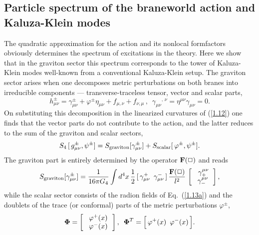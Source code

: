\documentclass[a4paper,preprint,nofootinbib,
                 showpacs,preprintnumbers,amsmath,amssymb]{revtex4}
\begin{document}
 
\subsection{Particle spectrum of the braneworld 
action and Kaluza-Klein modes \label{massless}} 
The quadratic approximation for the action and its nonlocal formfactors 
obviously determines the spectrum of excitations in the theory. Here we 
show that in the graviton sector this spectrum corresponds to the 
tower of Kaluza-Klein modes well-known from a conventional Kaluza-Klein 
setup. The graviton sector arises when one decomposes metric perturbations  
on both branes into irreducible components --- transverse-traceless  
tensor, vector and scalar parts, 
    \begin{equation} 
    h_{\mu\nu}^\pm=\gamma_{\mu\nu}^\pm 
    +\varphi^\pm\eta_{\mu\nu} 
    +f_{\mu,\nu}+f_{\nu,\mu}\,,\,\,\, 
    {\gamma_{\mu\nu}}^{,\,\nu} 
    =\eta^{\mu\nu}\gamma_{\mu\nu}=0.    \label{4.25} 
    \end{equation} 
On substituting this decomposition in the linearized curvatures of  
(\ref{1.12}) one finds that the vector parts do not contribute  
to the action, and the latter reduces to the sum of the graviton and 
scalar sectors, 
    \begin{equation} 
    S_4\,[\,g^\pm_{\mu\nu},\psi^\pm]= 
    S_{\rm graviton}[\gamma^\pm_{\mu\nu}]+ 
    S_{\rm scalar}[\,\varphi^\pm,\psi^\pm]. 
    \end{equation} 
The graviton part is entirely determined by the operator ${\bf 
F}(\Box)$ and reads 
    \begin{equation} 
    S_{\rm graviton}[\gamma^\pm_{\mu\nu}] 
    =\frac1{16\pi G_4}\int 
    d^4x\,\frac12\, 
    [\,\gamma_{\mu\nu}^+\,\,\,\gamma_{\mu\nu}^-\,] 
    \,\frac{\bf F(\Box)}{l^2}\, 
    \left[\begin{array}{c} 
    \,\,\gamma^{\mu\nu}_+ \\ 
    \,\,\gamma^{\mu\nu}_-\, 
    \end{array}\right],        \label{4.24} 
    \end{equation} 
while the scalar sector consists of the radion fields of Eq.~(\ref{1.13a}) 
and the doublets of the trace (or conformal) parts of the metric 
perturbations $\varphi^\pm$, 
    \begin{equation} 
    {\bf\Phi}=\left[\begin{array}{c} 
    \,\,\varphi^+(x)\,\\ 
    \,\,\varphi^-(x)\, 
    \end{array}\right],\,\,\, 
    {\bf\Phi}^T=\Big[\,\varphi^+(x)\,\,\, 
    \varphi^-(x)\,\Big]. 
    \end{equation} 
\end{document}
